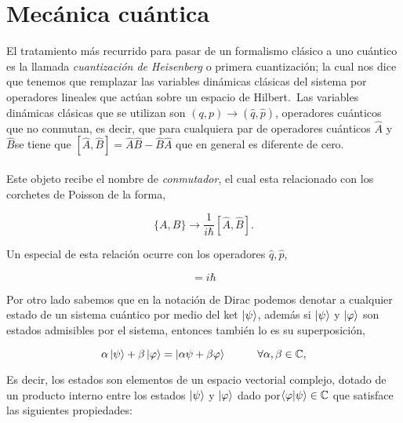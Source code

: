 \section{Mecánica cuántica}
\label{cap3:sec:Mecanica cuantica}

El tratamiento más recurrido para pasar de un formalismo clásico a uno cuántico es la llamada \emph{cuantización de Heisenberg} o primera cuantización; la cual nos dice que tenemos que remplazar las variables dinámicas clásicas del sistema por operadores lineales que actúan sobre un espacio de Hilbert.\
Las variables dinámicas clásicas que se utilizan son $(q,p)\rightarrow(\hat{q},\hat{p})$, operadores cuánticos que no conmutan, es decir, que para cualquiera par de operadores cuánticos $\hat{A}$ y $\hat{B}$se tiene que $[\hat{A},\hat{B}]=\hat{A}\hat{B}-\hat{B}\hat{A}$ que en general es diferente de cero.\\\\
 Este objeto recibe el nombre de \emph{conmutador}, el cual esta relacionado con los corchetes de Poisson de la forma,
 
 \begin{equation*}
 \lbrace A,B \rbrace \rightarrow \frac{1}{i\hbar}[\hat{A},\hat{B}].
 \end{equation*}

Un especial de esta relación ocurre con los operadores $\hat{q},\hat{p}$,

\begin{equation*}
[\hat{A},\hat{B}]=i\hbar
\end{equation*}

Por otro lado sabemos que en la notación de Dirac podemos denotar a cualquier estado de un sistema cuántico por medio del ket $ \ket{\psi} $, además si $ \ket{\psi} $ y $ \ket{\varphi} $ son estados admisibles por el sistema, entonces también lo es su superposición,

\begin{equation*}
\alpha \ket{\psi}+\beta \ket{\varphi}=\ket{\alpha\psi+\beta\varphi}  \hspace{1cm}\forall \alpha,\beta \in \mathbb{C},
\end{equation*} 

Es decir, los estados son elementos de un espacio vectorial complejo, dotado de un producto interno entre los estados $ \ket{\psi} $ y $ \ket{\varphi} $ dado por$ \braket{\varphi}{\psi} \in \mathbb{C} $ que satisface las siguientes propiedades:

